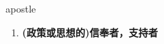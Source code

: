 
\begin{frame}
{\huge apostle}
\begin{center}
\begin{enumerate}\Large
  \item \textbf{(政策或思想的)信奉者，支持者}
\end{enumerate}
\end{center}
\end{frame}
